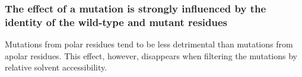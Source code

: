 \documentclass[10pt, british]{beamer}
\begin{document}
\begin{frame}
	\frametitle{The effect of a mutation is strongly influenced by the identity of the wild-type and mutant residues}
	Mutations from polar residues tend to be less detrimental than mutations from apolar residues.
	This effect, however, disappears when filtering the mutations by relative solvent accessibility.
	\vfill%
	\centering%
	
\end{frame}
%
%	
%
%	
%
\end{document}
